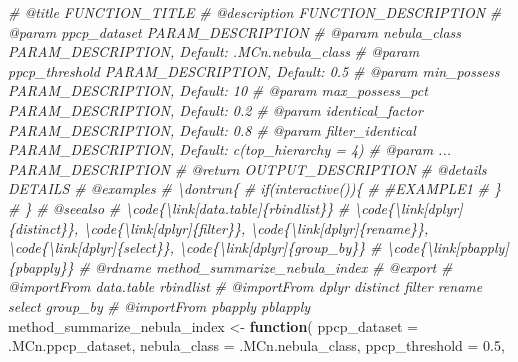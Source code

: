 \documentclass[
]{article}
\newenvironment{Shaded}{\begin{snugshade}}{\end{snugshade}}
\newcommand{\AttributeTok}[1]{\textcolor[rgb]{0.77,0.63,0.00}{#1}}
\newcommand{\CommentTok}[1]{\textcolor[rgb]{0.56,0.35,0.01}{\textit{#1}}}
\newcommand{\ControlFlowTok}[1]{\textcolor[rgb]{0.13,0.29,0.53}{\textbf{#1}}}
\newcommand{\FloatTok}[1]{\textcolor[rgb]{0.00,0.00,0.81}{#1}}
\newcommand{\NormalTok}[1]{#1}
\newcommand{\OtherTok}[1]{\textcolor[rgb]{0.56,0.35,0.01}{#1}}
\begin{document}
\begin{Shaded}
\begin{Highlighting}[]
\CommentTok{\#\textquotesingle{} @title FUNCTION\_TITLE}
\CommentTok{\#\textquotesingle{} @description FUNCTION\_DESCRIPTION}
\CommentTok{\#\textquotesingle{} @param ppcp\_dataset PARAM\_DESCRIPTION}
\CommentTok{\#\textquotesingle{} @param nebula\_class PARAM\_DESCRIPTION, Default: .MCn.nebula\_class}
\CommentTok{\#\textquotesingle{} @param ppcp\_threshold PARAM\_DESCRIPTION, Default: 0.5}
\CommentTok{\#\textquotesingle{} @param min\_possess PARAM\_DESCRIPTION, Default: 10}
\CommentTok{\#\textquotesingle{} @param max\_possess\_pct PARAM\_DESCRIPTION, Default: 0.2}
\CommentTok{\#\textquotesingle{} @param identical\_factor PARAM\_DESCRIPTION, Default: 0.8}
\CommentTok{\#\textquotesingle{} @param filter\_identical PARAM\_DESCRIPTION, Default: c(top\_hierarchy = 4)}
\CommentTok{\#\textquotesingle{} @param ... PARAM\_DESCRIPTION}
\CommentTok{\#\textquotesingle{} @return OUTPUT\_DESCRIPTION}
\CommentTok{\#\textquotesingle{} @details DETAILS}
\CommentTok{\#\textquotesingle{} @examples }
\CommentTok{\#\textquotesingle{} \textbackslash{}dontrun\{}
\CommentTok{\#\textquotesingle{} if(interactive())\{}
\CommentTok{\#\textquotesingle{}  \#EXAMPLE1}
\CommentTok{\#\textquotesingle{}  \}}
\CommentTok{\#\textquotesingle{} \}}
\CommentTok{\#\textquotesingle{} @seealso }
\CommentTok{\#\textquotesingle{}  \textbackslash{}code\{\textbackslash{}link[data.table]\{rbindlist\}\}}
\CommentTok{\#\textquotesingle{}  \textbackslash{}code\{\textbackslash{}link[dplyr]\{distinct\}\}, \textbackslash{}code\{\textbackslash{}link[dplyr]\{filter\}\}, \textbackslash{}code\{\textbackslash{}link[dplyr]\{rename\}\}, \textbackslash{}code\{\textbackslash{}link[dplyr]\{select\}\}, \textbackslash{}code\{\textbackslash{}link[dplyr]\{group\_by\}\}}
\CommentTok{\#\textquotesingle{}  \textbackslash{}code\{\textbackslash{}link[pbapply]\{pbapply\}\}}
\CommentTok{\#\textquotesingle{} @rdname method\_summarize\_nebula\_index}
\CommentTok{\#\textquotesingle{} @export }
\CommentTok{\#\textquotesingle{} @importFrom data.table rbindlist}
\CommentTok{\#\textquotesingle{} @importFrom dplyr distinct filter rename select group\_by}
\CommentTok{\#\textquotesingle{} @importFrom pbapply pblapply}
\NormalTok{method\_summarize\_nebula\_index }\OtherTok{\textless{}{-}}
  \ControlFlowTok{function}\NormalTok{(}
           \AttributeTok{ppcp\_dataset =}\NormalTok{ .MCn.ppcp\_dataset,}
           \AttributeTok{nebula\_class =}\NormalTok{ .MCn.nebula\_class,}
           \AttributeTok{ppcp\_threshold =} \FloatTok{0.5}\NormalTok{,}

\end{Highlighting}
\end{Shaded}
\end{document}

